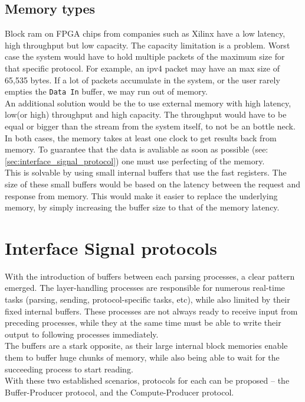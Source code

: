 \subsection{Memory types}  \label{subsec:memory_types}
Block ram on FPGA chips from companies such as Xilinx have a low latency, high
throughput but low capacity.\cite{xilinx_fpga_memory_resources}
The capacity limitation is a problem. Worst case the
system would have to hold multiple packets of the maximum size for that specific
protocol. For example, an \gls{ipv4} packet may have an max size of 65,535
bytes.\cite{RFC0791} If a lot of packets accumulate in the system, or the user
rarely empties the \texttt{Data In} buffer, we may run out of memory.\\
An additional solution would be the to use external memory with high latency,
low(or high) throughput and high capacity. The throughput would have to be equal
or bigger than the stream from the system itself, to not be an bottle neck.\\
In both cases, the memory takes at least one clock to get results back from
memory. To guarantee that the data is avaliable as soon as possible
(see: \autoref{sec:interface_signal_protocol}) one must use perfecting of the
memory.\\
This is solvable by using small internal buffers that use the fast registers.
The size of these small buffers would be based on the latency between the
request and response from memory. This would make it easier to
replace the underlying memory, by simply increasing the buffer size to that
of the memory latency.


\section{Interface Signal protocols}
\label{sec:interface_signal_protocol}
With the introduction of buffers between each parsing processes, a clear pattern
emerged. The layer-handling processes are responsible for numerous real-time tasks
(parsing, sending, protocol-specific tasks, etc), while also limited by their
fixed internal buffers. These processes are not always ready to receive input
from preceding processes, while they at the same time must be able to write their
output to following processes immediately.\\
The buffers are a stark opposite, as their large internal block memories enable
them to buffer huge chunks of memory, while also being able to wait for the
succeeding process to start reading.\\
With these two established scenarios, protocols for each can be proposed -- the
Buffer-Producer protocol, and the Compute-Producer protocol.

